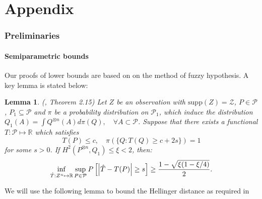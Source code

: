 \documentclass{article}
\def\gP{{\mathcal{P}}}
\def\gZ{{\mathcal{Z}}}
\newcommand{\R}{\mathbb{R}}
\newtheorem{lemma}{Lemma}[section]
\begin{document}
%
%
%
%
%

\newpage
\appendix


\part{Appendix} %
\parttoc %

\newpage


\section{Preliminaries}
\label{sec:lower-bound-prelim}

\subsection{Semiparametric bounds}

Our proofs of lower bounds are based on on the method of fuzzy hypothesis. A key lemma is stated below:

\begin{lemma}
    \label{fano-method}
    (\cite{tsybakov2008introduction}, Theorem 2.15) Let $Z$ be an observation with $\mathrm{supp}(Z)=\gZ$, $P\in\gP$, $P_1\subseteq \gP$ and $\pi$ be a probability distribution on $\gP_1$, which induce the distribution $Q_1(A)=\int Q^{\otimes n}(A) d \pi(Q), \quad \forall A \subset \gP$.
    Suppose that there exists a functional $T: \gP\mapsto\R$ which satisfies 
    \begin{equation}
        \label{fano:separation-condition}
        T(P)\leq c, \quad \pi(\{Q: T(Q) \geq c+2 s\})=1
    \end{equation}
    for some $s>0$. If $H^2\left(P^{\otimes n}, Q_1\right) \leq \xi<2$, then:
    \begin{equation}
        \notag
        \inf_{\hat{T}: \gZ^n\mapsto\R} \sup_{P \in \mathcal{P}} P\left[\left|\hat{T}-T(P)\right|\geq s\right] \geq \frac{1-\sqrt{\xi(1-\xi / 4)}}{2}.
    \end{equation}
\end{lemma}

We will use the following lemma to bound the Hellinger distance as required in 
\end{document}
